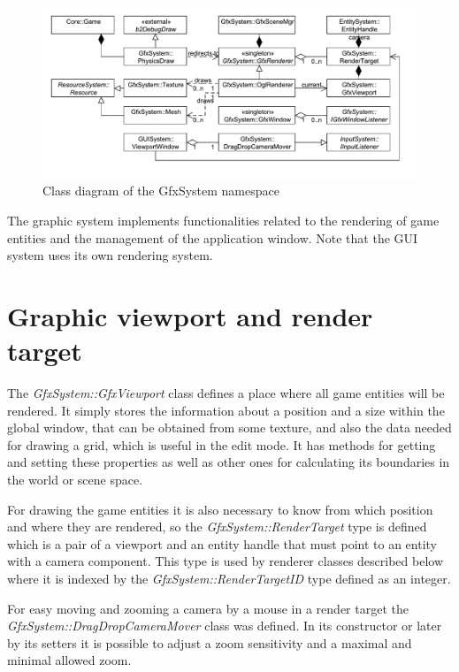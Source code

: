 \documentclass[a4paper, 12pt]{report}
\begin{document}
\begin{figure}[htbp]
	\centering
		\includegraphics[width=1\textwidth]{GfxSystemClassDiagram.pdf}
	\caption{Class diagram of the GfxSystem namespace}
	\label{fig:gfxsystem-diagram}
\end{figure}

The graphic system implements functionalities related to the rendering of game entities and the management of the application window. Note that the GUI system uses its own rendering system.

\section{Graphic viewport and render target}
\label{sec:render-target}

The \emph{GfxSystem::GfxViewport} class defines a place where all game entities will be rendered. It simply stores the information about a position and a size within the global window, that can be obtained from some texture, and also the data needed for drawing a grid, which is useful in the edit mode. It has methods for getting and setting these properties as well as other ones for calculating its boundaries in the world or scene space.

For drawing the game entities it is also necessary to know from which position and where they are rendered, so the \emph{GfxSystem::RenderTarget} type is defined which is a pair of a viewport and an entity handle that must point to an entity with a camera component. This type is used by renderer classes described below where it is indexed by the \emph{GfxSystem::RenderTargetID} type defined as an integer.

For easy moving and zooming a camera by a mouse in a render target the \emph{GfxSystem::DragDropCameraMover} class was defined. In its constructor or later by its setters it is possible to adjust a zoom sensitivity and a maximal and minimal allowed zoom.
\end{document}
